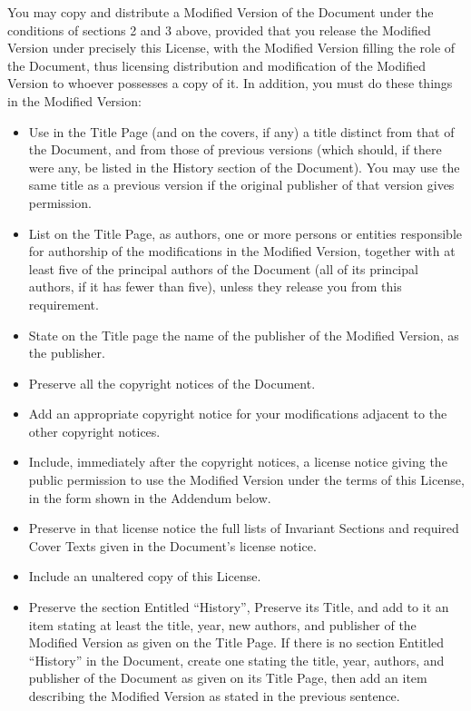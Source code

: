 \noindent
You may copy and distribute a Modified Version of the
Document under the conditions of sections 2 and 3 above,
provided that you release the Modified Version under
precisely this License, with the Modified Version filling
the role of the Document, thus licensing distribution and
modification of the Modified Version to whoever possesses
a copy of it. In addition, you must do these things in
the Modified Version:

\begin{itemize}
\item[A.]
  Use in the Title Page (and on the covers, if any) a
  title distinct from that of the Document, and from those
  of previous versions (which should, if there were any,
  be listed in the History section of the Document). You
  may use the same title as a previous version if the
  original publisher of that version gives permission.

\item[B.]
  List on the Title Page, as authors, one or more persons
  or entities responsible for authorship of the
  modifications in the Modified Version, together with at
  least five of the principal authors of the Document (all
  of its principal authors, if it has fewer than five),
  unless they release you from this requirement.

\item[C.]
  State on the Title page the name of the publisher of the
  Modified Version, as the publisher.

\item[D.]
  Preserve all the copyright notices of the Document.

\item[E.]
  Add an appropriate copyright notice for your
  modifications adjacent to the other copyright notices.

\item[F.]
  Include, immediately after the copyright notices, a
  license notice giving the public permission to use the
  Modified Version under the terms of this License, in the
  form shown in the Addendum below.

\item[G.]
  Preserve in that license notice the full lists of
  Invariant Sections and required Cover Texts given in the
  Document's license notice.

\item[H.]
  Include an unaltered copy of this License.

\item[I.]
  Preserve the section Entitled \enquote{History}, Preserve
  its Title, and add to it an item stating at least the
  title, year, new authors, and publisher of the Modified
  Version as given on the Title Page. If there is no section
  Entitled \enquote{History} in the Document, create one
  stating the title, year, authors, and publisher of the
  Document as given on its Title Page, then add an item
  describing the Modified Version as stated in the previous
  sentence.


\end{itemize}

